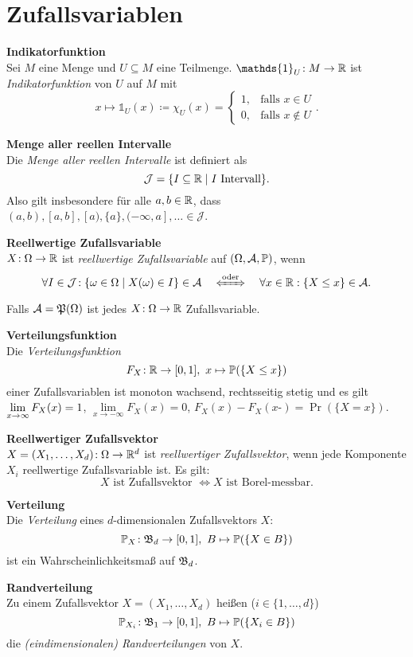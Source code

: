 \section{Zufallsvariablen}
\textbf{Indikatorfunktion}\\
Sei $M$ eine Menge und $U\subseteq M$ eine Teilmenge.
$\mathds{1}_U\!: M\to\R$ ist \textit{Indikatorfunktion} von $U$ auf $M$ mit
\[
  x\mapsto\mathds{1}_U(x)\coloneqq\chi_U(x)=\begin{cases} 1, & \text{falls }x\in U \\ 0, & \text{falls }x\notin U \end{cases}.
\]

\textbf{Menge aller reellen Intervalle}\\
Die \textit{Menge aller reellen Intervalle} ist definiert als
\[
  \mathcal{J}=\{I\subseteq\mathbb{R} \mid I \text{ Intervall}\}.
\]
Also gilt insbesondere für alle $a,b\in\mathbb{R}$, dass $(a,b),[a,b],[a),\{a\},(-\infty,a],\ldots\in\mathcal{J}$.

\textbf{Reellwertige Zufallsvariable}\\
$X\!: \Omega\to\mathbb{R}$ ist \textit{reellwertige Zufallsvariable} auf $(\Omega,\mathcal{A},\mathbb{P})$,
wenn
\[
  \forall I \in \mathcal{J}\!: \{\o\in\O \mid X(\o) \in I\} \in \A \quad\xLeftrightarrow{\text{oder}}\quad \forall x\in\R:\{X\leq x\}\in\A.
\]
Falls $\mathcal{A} = \mathfrak{P}(\Omega)$ ist jedes $X\!: \Omega\to\mathbb{R}$ Zufallsvariable.

\textbf{Verteilungsfunktion}\\
Die \textit{Verteilungsfunktion}
\[
  F_X\!: \mathbb{R} \to [0,1],\ x \mapsto \mathbb{P}(\{X \leq x\})
\]
einer Zufallsvariablen ist monoton wachsend, rechtsseitig stetig und es gilt\\
$\lim\limits_{x\to\infty} F_X(x) = 1$,
$\lim\limits_{x\to -\infty} F_X(x) = 0$,
$F_X(x) - F_X(x\text{-}) = \Pr(\{X = x\})$.

\textbf{Reellwertiger Zufallsvektor}\\
$X = (X_1,\ldots,X_d)\!: \Omega\to\mathbb{R}^d$ ist \textit{reellwertiger Zufallsvektor},
wenn jede Komponente $X_i$ reellwertige Zufallsvariable ist.
Es gilt:\\
\[
  X \text{ ist Zufallsvektor } \Leftrightarrow X \text{ ist Borel-messbar.}
\]

\textbf{Verteilung}\\
Die \textit{Verteilung} eines $d$-dimensionalen Zufallsvektors $X$:
\[
  \mathbb{P}_X\!: \mathfrak{B}_d \to [0,1],\ B \mapsto \mathbb{P}(\{X \in B\})
\]
ist ein Wahrscheinlichkeitsmaß auf $\mathfrak{B}_d$.

\textbf{Randverteilung}\\
Zu einem Zufallsvektor $X = (X_1,\ldots,X_d)$ heißen ($i\in\{1,\ldots,d\}$)
\[
  \mathbb{P}_{X_i}\!: \mathfrak{B}_1 \to [0,1],\ B \mapsto \mathbb{P}(\{X_i \in B\})
\]
die \textit{(eindimensionalen) Randverteilungen} von $X$.

